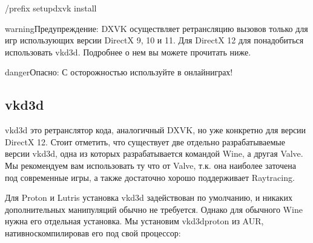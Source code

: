\documentclass[letterpaper,10pt,russian,openany]{sphinxmanual}
\begin{document}
\begin{sphinxVerbatim}[commandchars=\\\{\}]
\PYGZti{}/prefix setup\PYGZus{}dxvk install 
\end{sphinxVerbatim}

\begin{sphinxadmonition}{warning}{Предупреждение:}
\sphinxAtStartPar
DXVK осуществляет ретрансляцию вызовов только для игр использующих версии DirectX 9, 10 и 11.
Для DirectX 12 для понадобиться использовать vkd3d. Подробнее о нем вы можете прочитать ниже.
\end{sphinxadmonition}

\begin{sphinxadmonition}{danger}{Опасно:}
\sphinxAtStartPar
С осторожностью используйте  в онлайн\sphinxhyphen{}играх!
\end{sphinxadmonition}

\ignorespaces 

\subsection{vkd3d}
\label{\detokenize{source/linux-gaming:vkd3d}}\label{\detokenize{source/linux-gaming:index-11}}\label{\detokenize{source/linux-gaming:id10}}
\sphinxAtStartPar
vkd3d \sphinxhyphen{} это ретранслятор кода, аналогичный DXVK, но уже конкретно для версии DirectX 12.
Стоит отметить, что существует две отдельно разрабатываемые версии vkd3d,
одна из которых разрабатывается командой Wine, а другая \sphinxhyphen{} Valve.
Мы рекомендуем вам использовать ту что от Valve, т.к. она наиболее заточена под современные игры,
а также достаточно хорошо поддерживает Raytracing.

\sphinxAtStartPar
{}

\sphinxAtStartPar
Для Proton и Lutris установка vkd3d задействован по умолчанию, и никаких дополнительных манипуляций обычно не требуется.
Однако для обычного Wine нужна его отдельная установка. Мы установим vkd3d\sphinxhyphen{}proton из AUR, нативно\sphinxhyphen{}скомпилировав его под свой процессор:
\end{document}
